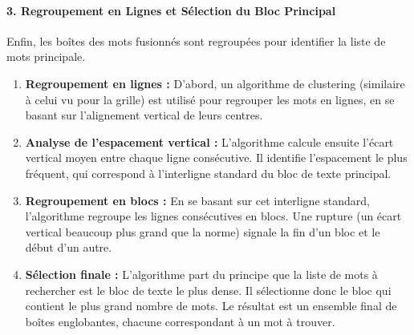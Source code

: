 \documentclass{article}
\begin{document}
\paragraph{3. Regroupement en Lignes et Sélection du Bloc Principal}
Enfin, les boîtes des mots fusionnés sont regroupées pour identifier la liste de mots principale.
\begin{enumerate}
    \item \textbf{Regroupement en lignes :} D'abord, un algorithme de clustering (similaire à celui vu pour la grille) est utilisé pour regrouper les mots en lignes, en se basant sur l'alignement vertical de leurs centres.

    \item \textbf{Analyse de l'espacement vertical :} L'algorithme calcule ensuite l'écart vertical moyen entre chaque ligne consécutive. Il identifie l'espacement le plus fréquent, qui correspond à l'interligne standard du bloc de texte principal.

    \item \textbf{Regroupement en blocs :} En se basant sur cet interligne standard, l'algorithme regroupe les lignes consécutives en blocs. Une rupture (un écart vertical beaucoup plus grand que la norme) signale la fin d'un bloc et le début d'un autre.

    \item \textbf{Sélection finale :} L'algorithme part du principe que la liste de mots à rechercher est le bloc de texte le plus dense. Il sélectionne donc le bloc qui contient le plus grand nombre de mots. Le résultat est un ensemble final de boîtes englobantes, chacune correspondant à un mot à trouver.
\end{enumerate}
\end{document}
